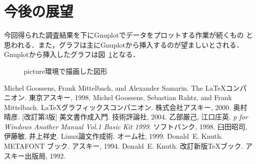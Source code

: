 ﻿\documentclass[twocolumn,papersize]{jsarticle}
\begin{document}
\section{今後の展望}
今回得られた調査結果を下にGnuplotでデータをプロットする作業が続くもの
と思われる．また，グラフは主にGnuplotから挿入するのが望ましいとされる．
Gnuplotから挿入したグラフは図~\ref{fig:sample}となる．
\begin{figure}[htbp]
\begin{center}
\fbox{\rule{0pt}{3zw}\rule{3zw}{0pt}}
\caption{picture環境で描画した図形}\label{fig:sample}
\end{center}
\end{figure}
\nocite{*}
\begin{thebibliography}{10}%
   Michel Goossens, Frank Mittelbach, and Alexander Samarin.
   The \LaTeX コンパニオン.
   東京アスキー, 1998.
   Michel Goossens, Sebastian Rahtz, and Frank Mittelbach.
   \LaTeX グラフィックスコンパニオン.
   株式会社アスキー, 2000.
   奥村晴彦.
   [改訂第3版] {\LaTeXe} 美文書作成入門.
   技術評論社, 2004.
   乙部厳己, 江口庄英.
   {\em {p\LaTeXe} for Windows Another Manual Vol.1 Basic Kit 1999}.
   ソフトバンク, 1998.
   臼田昭司, 伊藤敏, 井上祥史.
   Linux論文作成術.
   オーム社, 1999.
   Donald~E. Knuth.
   \textsf{METAFONT} ブック.
   アスキー, 1994.
   Donald~E. Knuth.
   改訂新版{\TeX}ブック.
   アスキー出版局, 1992.
\end{thebibliography}
\end{document}
